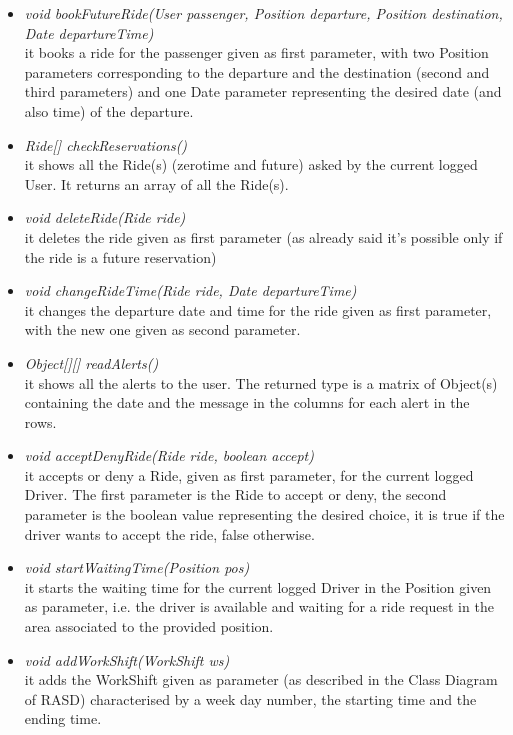 \documentclass[\mainpath/main]{subfiles}
\begin{document}
\begin{itemize}
\begin{itemize}
		\item \textit{void bookFutureRide(User passenger, Position departure, Position destination, Date departureTime)}\\
		it books a ride for the passenger given as first parameter, with two Position parameters corresponding to the departure and the destination (second and third parameters) and one Date parameter representing the desired date (and also time) of the departure.
		
		\item \textit{Ride[] checkReservations()}\\
		it shows all the Ride(s) (zerotime and future) asked by the current logged User. It returns an array of all the Ride(s).

		\item \textit{void deleteRide(Ride ride)}\\
		it deletes the ride given as first parameter (as already said it's possible only if the ride is a future reservation)

		\item \textit{void changeRideTime(Ride ride, Date departureTime)}\\
		it changes the departure date and time for the ride given as first parameter, with the new one given as second parameter.
		
		\item \textit{Object[][] readAlerts()}\\
		it shows all the alerts to the user. The returned type is a matrix of Object(s) containing the date and the message in the columns for each alert in the rows.
		
		\item \textit{void acceptDenyRide(Ride ride, boolean accept)}\\
		it accepts or deny a Ride, given as first parameter, for the current logged Driver. The first parameter is the Ride to accept or deny, the second parameter is the boolean value representing the desired choice, it is true if the driver wants to accept the ride, false otherwise.
		
		\item \textit{void startWaitingTime(Position pos)}\\
		it starts the waiting time for the current logged Driver in the Position given as parameter, i.e. the driver is available and waiting for a ride request in the area associated to the provided position.
		
		\item \textit{void addWorkShift(WorkShift ws)}\\
		it adds the WorkShift given as parameter (as described in the Class Diagram of RASD) characterised by a week day number, the starting time and the ending time.
		

\end{itemize}
\end{itemize}
\end{document}
